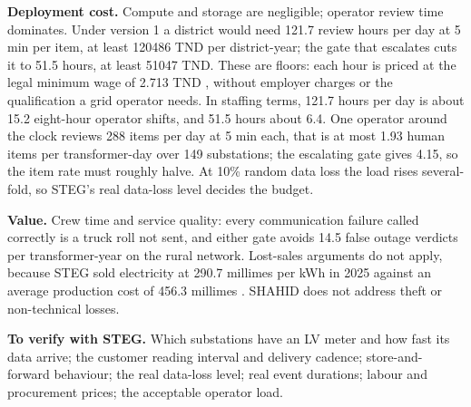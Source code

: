 \textbf{Deployment cost.} Compute and storage are negligible; operator review time dominates. Under
version 1 a district would need 121.7 review hours per day at 5 min per item, at least 120486 TND
per district-year; the gate that escalates cuts it to 51.5 hours, at least 51047 TND. These are
floors: each hour is priced at the legal minimum wage of 2.713 TND \cite{managers2026smig}, without
employer charges or the qualification a grid operator needs. In staffing terms, 121.7 hours per day
is about 15.2 eight-hour operator shifts, and 51.5 hours about 6.4. One operator around the clock
reviews 288 items per day at 5 min each, that is at most 1.93 human items per transformer-day over
149 substations; the escalating gate gives 4.15, so the item rate must roughly halve. At 10\% random data loss the load rises several-fold, so STEG's real
data-loss level decides the budget.

\textbf{Value.} Crew time and service quality: every communication failure called correctly is a truck
roll not sent, and either gate avoids 14.5 false outage verdicts per transformer-year on the rural
network. Lost-sales arguments do not apply, because STEG sold electricity at 290.7 millimes per kWh in
2025 against an average production cost of 456.3 millimes \cite{managers2026prix}. SHAHID does not
address theft or non-technical losses.

\textbf{To verify with STEG.} Which substations have an LV meter and how fast its data arrive; the
customer reading interval and delivery cadence; store-and-forward behaviour; the real data-loss level;
real event durations; labour and procurement prices; the acceptable operator load.
